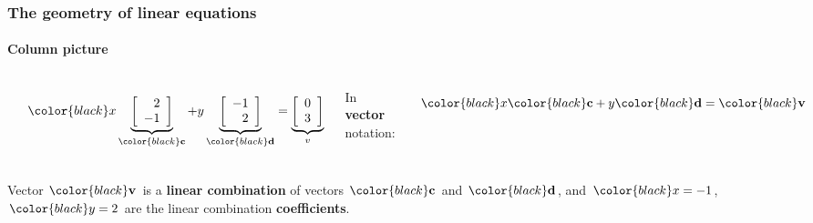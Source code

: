 \documentclass[compress]{beamer}
\newcommand{\black}[1]{{\color{black}#1}}
\renewcommand{\emph}[1]{\textbf{\black{#1}}}
\newcommand{\beq}[1]{\[\black{#1}\]}
\renewcommand{\cv}{\black{\mathbf{c}}}
\renewcommand{\d}{\black{\mathbf{d}}}
\renewcommand{\v}{\black{\mathbf{v}}}
\begin{document}
\begin{frame}
\frametitle{The geometry of linear equations}
\framesubtitle{Column picture}

\begin{columns}
\begin{center}
\includegraphics[trim = 2mm 2mm 2mm 2mm, clip, width=.7\textwidth]{./img/col-pic}
\end{center}

\beq{
x\underbrace{\left[
\begin{array}{r}
2\\-1
\end{array}
\right]}_{\cv}+
y\underbrace{\left[
\begin{array}{r}
-1\\2
\end{array}
\right]}_{\d}=
\underbrace{\left[
\begin{array}{r}
0\\3
\end{array}
\right]}_{v}
}

In \emph{vector} notation:

\beq{
x\cv + y\d = \v
}

\end{columns}

\vspace{.5cm}
Vector $\v$ is a \emph{linear combination} of vectors $\cv$ and $\d$, and $\black{x=-1}$, $\black{y=2}$ are the linear combination \emph{coefficients}.

\end{frame}
\end{document}
